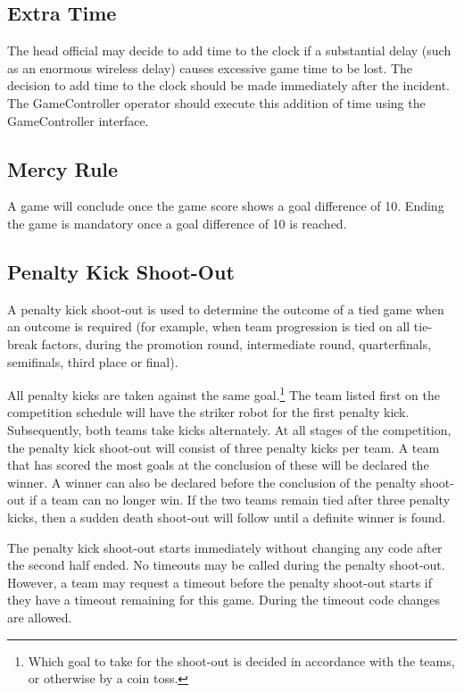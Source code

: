\subsection{Extra Time}
\label{sec:extra_time}

The head official may decide to add time to the clock if a substantial delay (such as an enormous wireless delay) causes excessive game time to be lost.
The decision to add time to the clock should be made immediately after the incident.
The GameController operator should execute this addition of time using the GameController interface.

\subsection{Mercy Rule}
\label{sec:mercy_rule}

A game will conclude once the game score shows a goal difference of 10.
Ending the game is mandatory once a goal difference of 10 is reached.

\subsection{Penalty Kick Shoot-Out}
\label{sec:penalty_shoot-out}

A penalty kick shoot-out is used to determine the outcome of a tied game when an outcome is required (for example, when team progression is tied on all tie-break factors, during the promotion round, intermediate round, quarterfinals, semifinals, third place or final).

All penalty kicks are taken against the same goal.\footnote{
  Which goal to take for the shoot-out is decided in accordance with the teams, or otherwise by a coin toss.
}
The team listed first on the competition schedule will have the striker robot for the first penalty kick.
Subsequently, both teams take kicks alternately.
At all stages of the competition, the penalty kick shoot-out will consist of three penalty kicks per team.
A team that has scored the most goals at the conclusion of these will be declared the winner.
A winner can also be declared before the conclusion of the penalty shoot-out if a team can no longer win.
If the two teams remain tied after three penalty kicks, then a sudden death shoot-out will follow until a definite winner is found.

The penalty kick shoot-out starts immediately without changing any code after the second half ended.
No timeouts may be called during the penalty shoot-out.
However, a team may request a timeout before the penalty shoot-out starts if they have a timeout remaining for this game.
During the timeout code changes are allowed.

